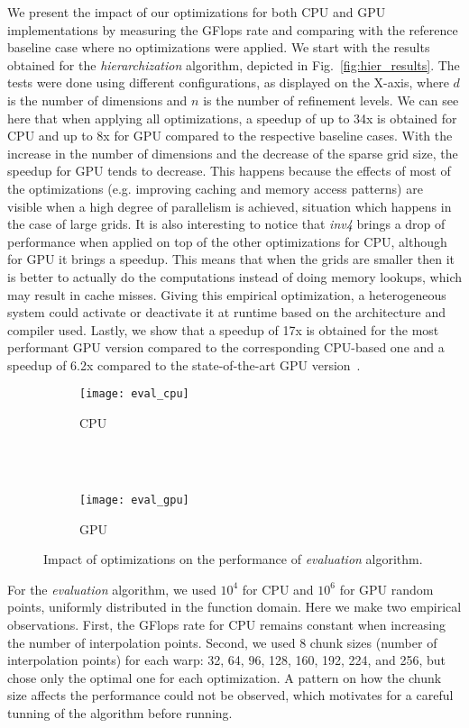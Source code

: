 We present the impact of our optimizations for both CPU and GPU implementations
by measuring the GFlops rate and comparing with the reference baseline case
where no optimizations were applied. We start with the results obtained for the
\textit{hierarchization} algorithm, depicted in Fig.~\ref{fig:hier_results}. The
tests were done using different configurations, as displayed on the X-axis,
where $d$ is the number of dimensions and $n$ is the number of refinement
levels. We can see here that when applying all optimizations, a speedup of up to
34x is obtained for CPU and up to 8x for GPU compared to the respective baseline
cases. With the increase in the number of dimensions and the decrease of the
sparse grid size, the speedup for GPU tends to decrease. This happens because
the effects of most of the optimizations (e.g. improving caching and memory
access patterns) are visible when a high degree of parallelism is achieved,
situation which happens in the case of large grids. It is also interesting to
notice that \textit{inv4} brings a drop of performance when applied on top of
the other optimizations for CPU, although for GPU it brings a speedup. This
means that when the grids are smaller then it is better to actually do the
computations instead of doing memory lookups, which may result in cache misses.
Giving this empirical optimization, a heterogeneous system could activate or
deactivate it at runtime based on the architecture and compiler used. Lastly, we
show that a speedup of 17x is obtained for the most performant GPU version
compared to the corresponding CPU-based one and a speedup of 6.2x compared to
the state-of-the-art GPU version~\cite{Murarasu:2011:CDS:1941553.1941559}.

\begin{figure}[t]
  \begin{subfigure}[b]{1\linewidth}
    \centering
    \texttt{[image: eval\_cpu]} \\
    \caption{CPU}
  \end{subfigure}
  \\ \\
  \begin{subfigure}[b]{1\linewidth}
    \centering
    \texttt{[image: eval\_gpu]}
    \caption{GPU}
  \end{subfigure}
  \caption{Impact of optimizations on the performance of \textit{evaluation} algorithm.}
  \label{fig:eval_results}
\end{figure}

For the \textit{evaluation} algorithm, we used $10^{4}$ for CPU and $10^{6}$
for GPU random points, uniformly distributed in the function domain. Here we
make two empirical observations. First, the GFlops rate for CPU remains constant
when increasing the number of interpolation points. Second, we used 8 chunk
sizes (number of interpolation points) for each warp: 32, 64, 96, 128, 160, 192,
224, and 256, but chose only the optimal one for each optimization. A pattern on
how the chunk size affects the performance could not be observed, which
motivates for a careful tunning of the algorithm before running.

